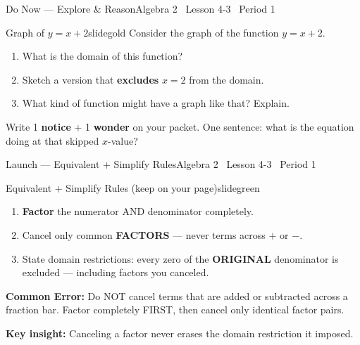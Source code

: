 \documentclass[aspectratio=169, 11pt]{beamer}
\begin{document}

\begin{frame}{Do Now --- Explore \& Reason}{Algebra 2 \textperiodcentered\ Lesson 4-3 \textperiodcentered\ Period 1}
\vspace{0.2cm}
\begin{projcard}{Graph of \(y = x + 2\)}{slidegold}
Consider the graph of the function \(y = x + 2\).

\vspace{0.25cm}
\begin{enumerate}
  \setlength{\itemsep}{0.2cm}
  \item What is the domain of this function?
  \item Sketch a version that \textbf{excludes} \(x = 2\) from the domain.
  \item What kind of function might have a graph like that? Explain.
\end{enumerate}

\vspace{0.1cm}
\small Write 1 \textbf{notice} + 1 \textbf{wonder} on your packet. One sentence: what is the equation doing at that skipped \(x\)-value?
\end{projcard}
\end{frame}

\begin{frame}{Launch --- Equivalent + Simplify Rules}{Algebra 2 \textperiodcentered\ Lesson 4-3 \textperiodcentered\ Period 1}
\vspace{0.2cm}
\begin{projcard}{Equivalent + Simplify Rules (keep on your page)}{slidegreen}
\begin{enumerate}
  \setlength{\itemsep}{0pt}
  \item \textbf{Factor} the numerator AND denominator completely.
  \item Cancel only common \textbf{FACTORS} --- never terms across \(+\) or \(-\).
  \item State domain restrictions: every zero of the \textbf{ORIGINAL} denominator is excluded --- including factors you canceled.
\end{enumerate}

\vspace{0.1cm}
\small
\textbf{Common Error:} Do NOT cancel terms that are added or subtracted across a fraction bar.
Factor completely FIRST, then cancel only identical factor pairs.

\vspace{0.1cm}
\textcolor{slideaccent}{\textbf{Key insight:} Canceling a factor never erases the domain restriction it imposed.}
\end{projcard}
\end{frame}
\end{document}
